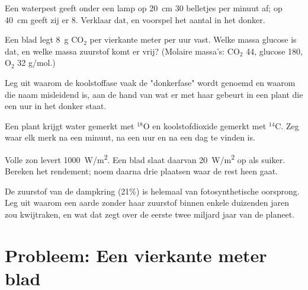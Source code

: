 \begin{exercise}[$\star\star$]\label{exo:g12:photosynthesis:10}
Een waterpest geeft onder een lamp op \qty{20}{cm} 30 belletjes per minuut
af; op \qty{40}{cm} geeft zij er 8. Verklaar dat, en voorspel het aantal
in het donker.
\end{exercise}

\begin{exercise}[$\star\star$]\label{exo:g12:photosynthesis:11}
Een blad legt \qty{8}{g} $\mathrm{CO_2}$ per vierkante meter per uur vast.
Welke massa glucose is dat, en welke massa zuurstof komt er vrij?
(Molaire massa's: $\mathrm{CO_2}$ 44, glucose 180, $\mathrm{O_2}$ 32
\unit{g/mol}.)
\end{exercise}

\begin{exercise}[$\star\star\star$]\label{exo:g12:photosynthesis:12}
Leg uit waarom de koolstoffase vaak de "donkerfase" wordt genoemd en
waarom die naam misleidend is, aan de hand van wat er met haar gebeurt in
een plant die een uur in het donker staat.
\end{exercise}

\begin{exercise}[$\star\star\star$]\label{exo:g12:photosynthesis:13}
Een plant krijgt water gemerkt met $^{18}$O en koolstofdioxide gemerkt met
$^{14}$C. Zeg waar elk merk na een minuut, na een uur en na een dag te
vinden is.
\end{exercise}

\begin{exercise}[$\star\star\star$]\label{exo:g12:photosynthesis:14}
Volle zon levert \qty{1000}{W/m^2}. Een blad slaat daarvan
\qty{20}{W/m^2} op als suiker. Bereken het rendement; noem daarna drie
plaatsen waar de rest heen gaat.
\end{exercise}

\begin{exercise}[$\star\star\star$]\label{exo:g12:photosynthesis:15}
De zuurstof van de dampkring (21\%) is helemaal van fotosynthetische
oorsprong. Leg uit waarom een aarde zonder  haar zuurstof
binnen enkele duizenden jaren zou kwijtraken, en wat dat zegt over de
eerste twee miljard jaar van de planeet.
\end{exercise}

\section{Probleem: Een vierkante meter blad}

